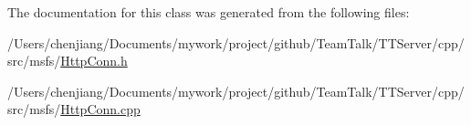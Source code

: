 The documentation for this class was generated from the following files\+:\begin{DoxyCompactItemize}
\item 
/\+Users/chenjiang/\+Documents/mywork/project/github/\+Team\+Talk/\+T\+T\+Server/cpp/src/msfs/\hyperlink{msfs_2_http_conn_8h}{Http\+Conn.\+h}\item 
/\+Users/chenjiang/\+Documents/mywork/project/github/\+Team\+Talk/\+T\+T\+Server/cpp/src/msfs/\hyperlink{msfs_2_http_conn_8cpp}{Http\+Conn.\+cpp}\end{DoxyCompactItemize}
